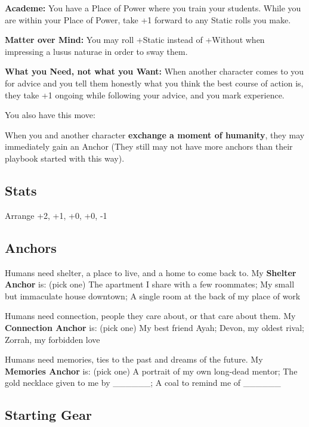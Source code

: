 \documentclass[10pt,twoside,openright]{memoir}
\begin{document}
\textbf{Academe:} You have a Place of Power where you train your
students. While you are within your Place of Power, take +1 forward to
any Static rolls you make.

\textbf{Matter over Mind:} You may roll +Static instead of +Without when
impressing a lusus naturae in order to sway them.

\textbf{What you Need, not what you Want:} When another character comes
to you for advice and you tell them honestly what you think the best
course of action is, they take +1 ongoing while following your advice,
and you mark experience.

You also have this move:

When you and another character \textbf{exchange a moment of humanity},
they may immediately gain an Anchor (They still may not have more
anchors than their playbook started with this way).

\hypertarget{stats-2}{%
\subsection{Stats}\label{stats-2}}

Arrange +2, +1, +0, +0, -1

\hypertarget{anchors-1}{%
\subsection{Anchors}\label{anchors-1}}

Humans need shelter, a place to live, and a home to come back to. My
\textbf{Shelter Anchor} is: (pick one) The apartment I share with a few
roommates; My small but immaculate house downtown; A single room at the
back of my place of work

Humans need connection, people they care about, or that care about them.
My \textbf{Connection Anchor} is: (pick one) My best friend Ayah; Devon,
my oldest rival; Zorrah, my forbidden love

Humans need memories, ties to the past and dreams of the future. My
\textbf{Memories Anchor} is: (pick one) A portrait of my own long-dead
mentor; The gold necklace given to me by \_\_\_\_\_\_; A coal to remind
me of \_\_\_\_\_\_

\hypertarget{starting-gear-1}{%
\subsection{Starting Gear}\label{starting-gear-1}}
\end{document}

